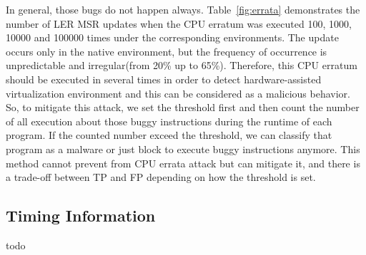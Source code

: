 In general, those bugs do not happen always. Table~\ref{fig:errata} demonstrates the number of LER MSR updates when the CPU erratum was executed 100, 1000, 10000 and 100000 times under the corresponding environments. The update occurs only in the native environment, but the frequency of occurrence is unpredictable and irregular(from 20\% up to 65\%). Therefore, this CPU erratum should be executed in several times in order to detect hardware-assisted virtualization environment and this can be considered as a malicious behavior. So, to mitigate this attack, we set the threshold first and then count the number of all execution about those buggy instructions during the runtime of each program. If the counted number exceed the threshold, we can classify that program as a malware or just block to execute buggy instructions anymore. This method cannot prevent from CPU errata attack but can mitigate it, and there is a trade-off between TP and FP depending on how the threshold is set. 

\subsection{Timing Information}
\label{sec:approach-timing}

todo


